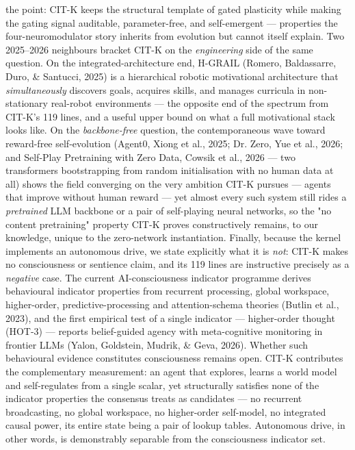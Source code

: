 \documentclass[11pt]{article}
\begin{document}
the point: CIT-K keeps the structural template of gated plasticity while making the gating signal auditable, parameter-free, and self-emergent — properties the four-neuromodulator story inherits from evolution but cannot itself explain. Two 2025–2026 neighbours bracket CIT-K on the \emph{engineering} side of the same question. On the integrated-architecture end, H-GRAIL (Romero, Baldassarre, Duro, \& Santucci, 2025) is a hierarchical robotic motivational architecture that \emph{simultaneously} discovers goals, acquires skills, and manages curricula in non-stationary real-robot environments — the opposite end of the spectrum from CIT-K's 119 lines, and a useful upper bound on what a full motivational stack looks like. On the \emph{backbone-free} question, the contemporaneous wave toward reward-free self-evolution (Agent0, Xiong et al., 2025; Dr. Zero, Yue et al., 2026; and Self-Play Pretraining with Zero Data, Cowsik et al., 2026 — two transformers bootstrapping from random initialisation with no human data at all) shows the field converging on the very ambition CIT-K pursues — agents that improve without human reward — yet almost every such system still rides a \emph{pretrained} LLM backbone or a pair of self-playing neural networks, so the "no content pretraining" property CIT-K proves constructively remains, to our knowledge, unique to the zero-network instantiation. Finally, because the kernel implements an autonomous drive, we state explicitly what it is \emph{not}: CIT-K makes no consciousness or sentience claim, and its 119 lines are instructive precisely as a \emph{negative} case. The current AI-consciousness indicator programme derives behavioural indicator properties from recurrent processing, global workspace, higher-order, predictive-processing and attention-schema theories (Butlin et al., 2023), and the first empirical test of a single indicator — higher-order thought (HOT-3) — reports belief-guided agency with meta-cognitive monitoring in frontier LLMs (Yalon, Goldstein, Mudrik, \& Geva, 2026). Whether such behavioural evidence constitutes consciousness remains open. CIT-K contributes the complementary measurement: an agent that explores, learns a world model and self-regulates from a single scalar, yet structurally satisfies none of the indicator properties the consensus treats as candidates — no recurrent broadcasting, no global workspace, no higher-order self-model, no integrated causal power, its entire state being a pair of lookup tables. Autonomous drive, in other words, is demonstrably separable from the consciousness indicator set.
\end{document}
